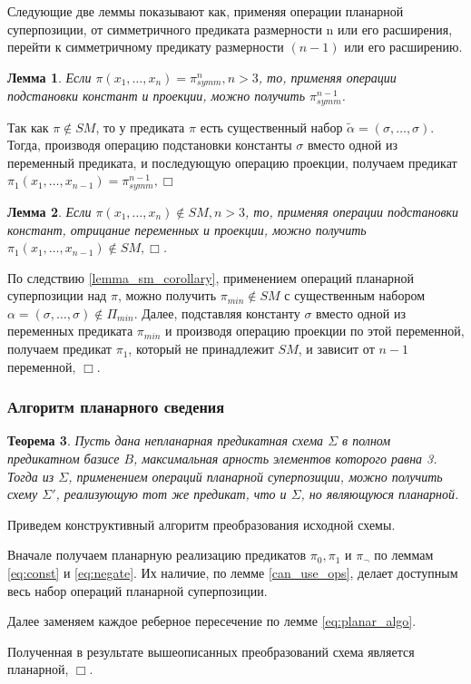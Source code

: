 \documentclass[12pt]{article}
\newtheorem{theorem}{Теорема}[section]
\newtheorem{lemma}[theorem]{Лемма}
\newenvironment{proof}[1][Доказательство]{\begin{trivlist}
\item[\hskip \labelsep {\bfseries #1}]}{\end{trivlist}}
\begin{document}
Следующие две леммы показывают как, применяя операции планарной суперпозиции, от симметричного предиката
размерности n или его расширения, перейти к симметричному предикату размерности $(n-1)$ или его расширению.

\begin{lemma}
\label{eq:svedenie1}
Если $\pi(x_1, \dots, x_n) = \pi_{symm}^n, n > 3$, то, 
применяя операции подстановки констант и проекции, можно получить $\pi_{symm}^{n-1}$.
\end{lemma}

\begin{proof}
Так как 
$\pi \notin SM$, то у предиката $\pi$ есть существенный набор $\widetilde{\alpha} = (\sigma, \dots, \sigma)$.
Тогда, производя операцию подстановки константы $\sigma$ вместо одной из переменный предиката, и последующую 
операцию проекции, получаем предикат $\pi_1(x_1, \dots, x_{n-1}) = \pi_{symm}^{n-1}, \Box$
\end{proof}

\begin{lemma}
\label{eq:svedenie2}
Если $\pi(x_1, \dots, x_n) \notin SM, n > 3$, то, применяя операции подстановки констант, отрицание переменных и 
проекции, можно получить $\pi_1(x_1, \dots, x_{n-1}) \notin SM, \Box$.
\end{lemma}

\begin{proof}
По следствию \ref{lemma_sm_corollary}, применением операций планарной суперпозиции над $\pi$, можно получить 
$\pi_{min} \notin SM$ с существенным набором $\alpha=(\sigma, \dots, \sigma) \notin \Pi_{min}$. 
Далее, подставляя константу $\sigma$ вместо одной из переменных предиката $\pi_{min}$ и производя операцию проекции по
этой переменной, получаем предикат $\pi_1$, который
не принадлежит $SM$, и зависит от $n-1$ переменной, $\Box$.
\end{proof}

\subsubsection{Алгоритм планарного сведения}

\begin{theorem}
\label{Theo1}
Пусть дана непланарная предикатная схема $\Sigma$ в полном предикатном базисе $B$, максимальная
арность элементов которого равна 3.
Тогда из $\Sigma$, применением операций планарной суперпозиции, можно получить схему $\Sigma'$,
реализующую тот же предикат, что и $\Sigma$, но являющуюся планарной.
\end{theorem}
\begin{proof}
Приведем конструктивный алгоритм преобразования исходной схемы.

Вначале получаем планарную реализацию предикатов $\pi_0, \pi_1$ и $\pi_{\neg}$ 
по леммам \ref{eq:const} и \ref{eq:negate}. Их наличие, по лемме \ref{can_use_ops},
делает доступным весь набор операций планарной суперпозиции. 

Далее заменяем каждое реберное пересечение по лемме \ref{eq:planar_algo}. 

Полученная в результате вышеописанных преобразований схема является планарной, $\Box$.
\end{proof}
\end{document}
